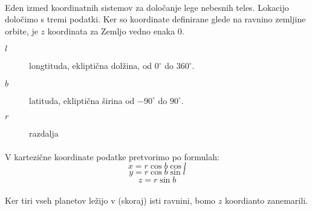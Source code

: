 \documentclass[a4paper, 12pt]{article}
\begin{document}
    \paragraph{}
    Eden izmed koordinatnih sistemov za določanje lege nebesnih teles. Lokacijo določimo s tremi podatki. Ker so koordinate definirane glede na ravnino zemljine orbite, je $z$ koordinata za Zemljo vedno enaka 0.
    \begin{description}
        \item[$l$] longtituda, ekliptična dolžina, od $0^\circ$ do $360^\circ$.
        \item[$b$] latituda, ekliptična širina od $-90^\circ$ do $90^\circ$.
        \item[$r$] razdalja
    \end{description}

    \paragraph{}
    V kartezične koordinate podatke pretvorimo po formulah:
    $$x = r \cos b \cos l$$
    $$y = r \cos b \sin l$$
    $$z = r \sin b$$

    \paragraph{}
    Ker tiri vseh planetov ležijo v (skoraj) isti ravnini, bomo $z$ koordianto zanemarili.
\end{document}

